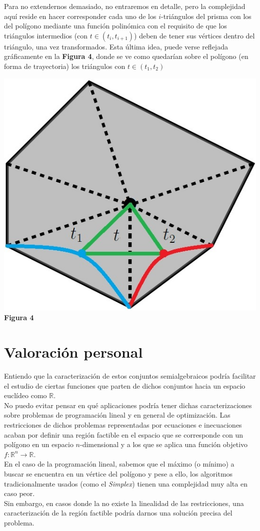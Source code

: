 \documentclass[11pt]{article}
\theoremstyle{definition} %
\newcommand{\R}{\mathbb{R}}
\newcommand{\function}[3]{#1\colon #2\to #3}
\begin{document}
Para no extendernos demasiado, no entraremos en detalle, pero la complejidad aquí reside en hacer corresponder cada uno de los $i$-triángulos del prisma con los del polígono mediante una función polinómica con el requisito de que los triángulos intermedios (con $t\in(t_i,t_{i+1})$) deben de tener sus vértices dentro del triángulo, una vez transformados. Esta última idea, puede verse reflejada gráficamente en la \textbf{Figura 4}, donde se ve como quedarían sobre el polígono (en forma de trayectoria) los triángulos con $t\in(t_1,t_2)$
\begin{center}
\includegraphics[scale=0.35]{4}\\\textbf{Figura 4}
\end{center}

\section{Valoración personal}
Entiendo que la caracterización de estos conjuntos semialgebraicos podría facilitar el estudio de ciertas funciones que parten de dichos conjuntos hacia un espacio euclídeo como $\R$.\\

No puedo evitar pensar en qué aplicaciones podría tener dichas caracterizaciones sobre problemas de programación lineal y en general de optimización. Las restricciones de dichos problemas representadas por ecuaciones e inecuaciones acaban por definir una región factible en el espacio que se corresponde con un polígono en un espacio $n$-dimensional y a los que se aplica una función objetivo $\function{f}{\R^n}{\R}$.\\

En el caso de la programación lineal, sabemos que el máximo (o mínimo) a buscar se encuentra en un vértice del polígono y pese a ello, los algoritmos tradicionalmente usados (como el \textit{Simplex}) tienen una complejidad muy alta en caso peor.\\

Sin embargo, en casos donde la no existe la linealidad de las restricciones, una caracterización de la región factible podría darnos una solución precisa del problema.
\end{document}
